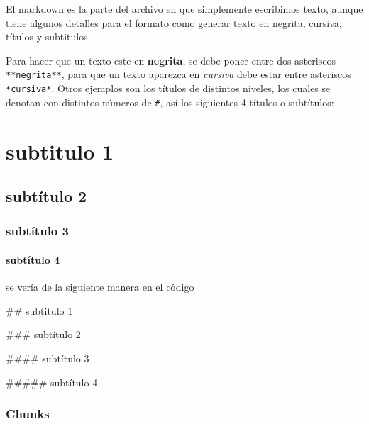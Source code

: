 \documentclass[]{book}
\newenvironment{Shaded}{\begin{snugshade}}{\end{snugshade}}
\newcommand{\NormalTok}[1]{#1}
\let\oldparagraph\paragraph
\renewcommand{\paragraph}[1]{\oldparagraph{#1}\mbox{}}
\begin{document}
El markdown es la parte del archivo en que simplemente escribimos texto,
aunque tiene algunos detalles para el formato como generar texto en
negrita, cursiva, títulos y subtitulos.

Para hacer que un texto este en \textbf{negrita}, se debe poner entre
dos asteriscos \texttt{**negrita**}, para que un texto aparezca en
\emph{cursiva} debe estar entre asteriscos \texttt{*cursiva*}. Otros
ejemplos son los títulos de distintos niveles, los cuales se denotan con
distintos números de \texttt{\#}, así los siguientes 4 títulos o
subtítulos:

\hypertarget{subtitulo-1}{%
\section*{subtitulo 1}\label{subtitulo-1}}

\hypertarget{subtitulo-2}{%
\subsection*{subtítulo 2}\label{subtitulo-2}}

\hypertarget{subtitulo-3}{%
\subsubsection*{subtítulo 3}\label{subtitulo-3}}

\hypertarget{subtitulo-4}{%
\paragraph{subtítulo 4}\label{subtitulo-4}}

se vería de la siguiente manera en el código

\begin{Shaded}
\begin{Highlighting}[]
\NormalTok{## subtitulo 1}

\NormalTok{### subtítulo 2}

\NormalTok{#### subtítulo 3}

\NormalTok{##### subtítulo 4}
\end{Highlighting}
\end{Shaded}

\hypertarget{chunks}{%
\subsubsection{Chunks}\label{chunks}}
\end{document}
